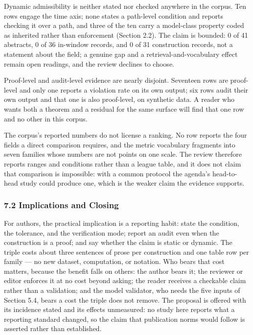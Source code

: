 \documentclass[11pt]{article}
\begin{document}
Dynamic admissibility is neither stated nor checked anywhere in the corpus. Ten rows engage the time axis; none states a path-level condition and reports checking it over a path, and three of the ten carry a model-class property coded as inherited rather than enforcement (Section 2.2). The claim is bounded: 0 of 41 abstracts, 0 of 36 in-window records, and 0 of 31 construction records, not a statement about the field; a genuine gap and a retrieval-and-vocabulary effect remain open readings, and the review declines to choose.

Proof-level and audit-level evidence are nearly disjoint. Seventeen rows are proof-level and only one reports a violation rate on its own output; six rows audit their own output and that one is also proof-level, on synthetic data. A reader who wants both a theorem and a residual for the same surface will find that one row and no other in this corpus.

The corpus's reported numbers do not license a ranking. No row reports the four fields a direct comparison requires, and the metric vocabulary fragments into seven families whose numbers are not points on one scale. The review therefore reports ranges and conditions rather than a league table, and it does not claim that comparison is impossible: with a common protocol the agenda's head-to-head study could produce one, which is the weaker claim the evidence supports.

\subsubsection*{7.2 Implications and Closing}
For authors, the practical implication is a reporting habit: state the condition, the tolerance, and the verification mode; report an audit even when the construction is a proof; and say whether the claim is static or dynamic. The triple costs about three sentences of prose per construction and one table row per family — no new dataset, computation, or notation. Who bears that cost matters, because the benefit falls on others: the author bears it; the reviewer or editor enforces it at no cost beyond asking; the reader receives a checkable claim rather than a validation; and the model validator, who needs the five inputs of Section 5.4, bears a cost the triple does not remove. The proposal is offered with its incidence stated and its effects unmeasured: no study here reports what a reporting standard changed, so the claim that publication norms would follow is asserted rather than established.
\end{document}

